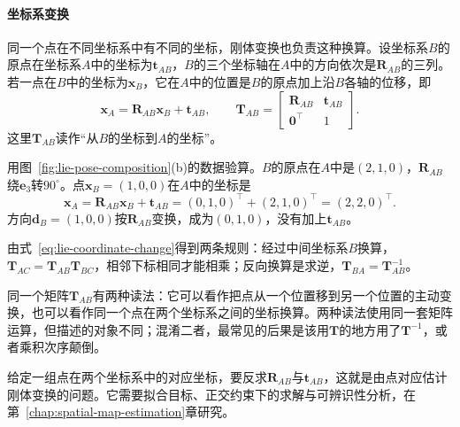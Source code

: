 \paragraph{坐标系变换}
同一个点在不同坐标系中有不同的坐标，刚体变换也负责这种换算。设坐标系$B$的原点在坐标系$A$中的坐标为$\bm t_{AB}$，$B$的三个坐标轴在$A$中的方向依次是$\bm R_{AB}$的三列。若一点在$B$中的坐标为$\bm x_B$，它在$A$中的位置是$B$的原点加上沿$B$各轴的位移，即
\begin{equation}
 \bm x_A=\bm R_{AB}\bm x_B+\bm t_{AB},\qquad
 \bm T_{AB}=\begin{bmatrix}\bm R_{AB}&\bm t_{AB}\\\bm0^\top&1\end{bmatrix}.
 \label{eq:lie-coordinate-change}
\end{equation}
这里$\bm T_{AB}$读作“从$B$的坐标到$A$的坐标”。

用图~\ref{fig:lie-pose-composition}(b)的数据验算。$B$的原点在$A$中是$(2,1,0)$，$\bm R_{AB}$绕$\bm e_3$转$90^\circ$。点$\bm x_B=(1,0,0)$在$A$中的坐标是
\[
\bm x_A=\bm R_{AB}\bm x_B+\bm t_{AB}=(0,1,0)^\top+(2,1,0)^\top=(2,2,0)^\top.
\]
方向$\bm d_B=(1,0,0)$按$\bm R_{AB}$变换，成为$(0,1,0)$，没有加上$\bm t_{AB}$。

由式~\eqref{eq:lie-coordinate-change}得到两条规则：经过中间坐标系$B$换算，$\bm T_{AC}=\bm T_{AB}\bm T_{BC}$，相邻下标相同才能相乘；反向换算是求逆，$\bm T_{BA}=\bm T_{AB}^{-1}$。

同一个矩阵$\bm T_{AB}$有两种读法：它可以看作把点从一个位置移到另一个位置的主动变换，也可以看作同一个点在两个坐标系之间的坐标换算。两种读法使用同一套矩阵运算，但描述的对象不同；混淆二者，最常见的后果是该用$\bm T$的地方用了$\bm T^{-1}$，或者乘积次序颠倒。

给定一组点在两个坐标系中的对应坐标，要反求$\bm R_{AB}$与$\bm t_{AB}$，这就是由点对应估计刚体变换的问题。它需要拟合目标、正交约束下的求解与可辨识性分析，在第~\ref{chap:spatial-map-estimation}章研究。
